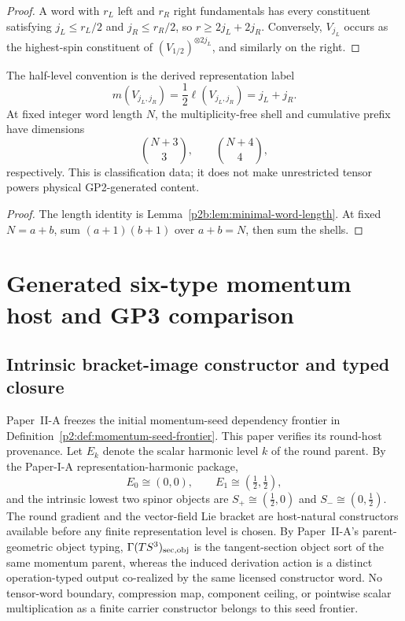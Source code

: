 \documentclass[12pt,a4paper]{article}
\begin{document}
\begin{proof}
A word with \(r_L\) left and \(r_R\) right fundamentals has every constituent
satisfying \(j_L\le r_L/2\) and \(j_R\le r_R/2\), so
\(r\ge2j_L+2j_R\).  Conversely, \(V_{j_L}\) occurs as the highest-spin
constituent of \((V_{1/2})^{\otimes2j_L}\), and similarly on the right.
\end{proof}

\begin{corollary}
\label{p2b:cor:word-degree-derived}
The half-level convention is the derived representation label
\[
 m(V_{j_L,j_R})=\frac12\ell(V_{j_L,j_R})=j_L+j_R.
\]
At fixed integer word length \(N\), the multiplicity-free shell and cumulative
prefix have dimensions
\[
 \binom{N+3}{3},\qquad \binom{N+4}{4},
\]
respectively.  This is classification data; it does not make unrestricted
tensor powers physical GP2-generated content.
\end{corollary}

\begin{proof}
The length identity is Lemma~\ref{p2b:lem:minimal-word-length}.  At fixed
\(N=a+b\), sum \((a+1)(b+1)\) over \(a+b=N\), then sum the shells.
\end{proof}

\section{Generated six-type momentum host and GP3 comparison}
\label{paper2b:sec:generated-six-type-host}
\label{p2b:subsec:unconditional-momentum-host}
\subsection{Intrinsic bracket-image constructor and typed closure}

Paper~II-A freezes the initial momentum-seed dependency frontier in
Definition~\ref{p2:def:momentum-seed-frontier}.  This paper verifies its
round-host provenance.  Let \(E_k\) denote the scalar harmonic level \(k\) of
the round parent.  By the Paper-I-A representation-harmonic package,
\[
 E_0\cong(0,0),\qquad E_1\cong(\tfrac12,\tfrac12),
\]
and the intrinsic lowest two spinor objects are
\(S_+\cong(\tfrac12,0)\) and \(S_-\cong(0,\tfrac12)\).  The round gradient and
the vector-field Lie bracket are host-natural constructors available before
any finite representation level is chosen.  By Paper~II-A's parent-geometric
object typing, \(\Gamma(TS^3)_{\rm sec,obj}\) is the tangent-section object
sort of the same momentum parent, whereas the induced derivation action is a
distinct operation-typed output co-realized by the same licensed constructor
word.  No tensor-word boundary,
compression map, component ceiling, or pointwise scalar multiplication as a
finite carrier constructor belongs to this seed frontier.
\end{document}
